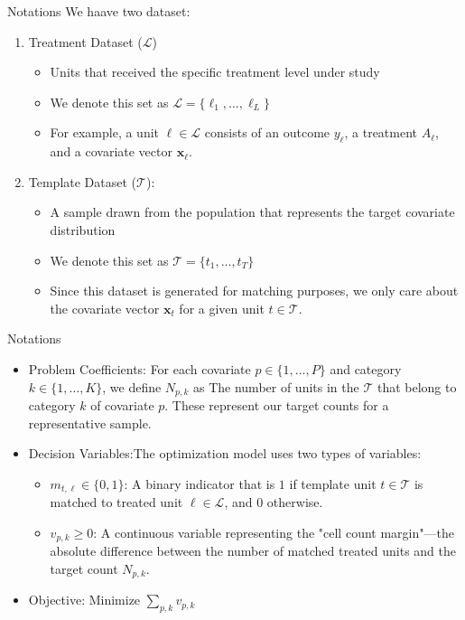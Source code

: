 \documentclass{beamer}
\begin{document}
\begin{frame}{Notations}
We haave two dataset:
\begin{enumerate}
	\item  Treatment Dataset ($\mathcal{L}$)
\begin{itemize}
	\item Units that received the specific treatment level under study
	\item  We denote this set as $\mathcal{L} = \{\ell_1, \ldots, \ell_L\}$
	\item For example, a unit $\ell \in \mathcal{L}$ consists of an outcome $y_{\ell}$, a treatment $A_{\ell}$, and a covariate vector $\mathbf{x}_{\ell}$.
\end{itemize}  
	\item  Template Dataset ($\mathcal{T}$):
	\begin{itemize}
		\item A sample drawn from the population that represents the target covariate distribution
		\item We denote this set as $\mathcal{T} = \{t_1, \ldots, t_T\}$
		\item  Since this dataset is generated for matching purposes, we only care about the covariate vector $\mathbf{x}_{t}$ for a given unit $t \in \mathcal{T}$.
	\end{itemize}
\end{enumerate}

\end{frame}
\begin{frame}{Notations}
\begin{itemize}
	\item Problem Coefficients: For each covariate $p \in \{1, \dots, P\}$ and category $k \in \{1, \dots, K\}$, we define
	$N_{p,k}$ as The number of units in the $\mathcal{T}$ that belong to category $k$ of covariate $p$. These represent our target counts for a representative sample.
	\item Decision Variables:The optimization model uses two types of variables:
\begin{itemize}
\item  $m_{t,\ell} \in \{0, 1\}$: A binary indicator that is $1$ if template unit $t \in \mathcal{T}$ is matched to treated unit $\ell \in \mathcal{L}$, and $0$ otherwise.
\item $v_{p,k} \geq 0$: A continuous variable representing the "cell count margin"—the absolute difference between the number of matched treated units and the target count $N_{p,k}$. %
\end{itemize}
\item Objective: Minimize $\sum_{p,k}v_{p,k}$
\end{itemize}



\end{frame}
\end{document}
